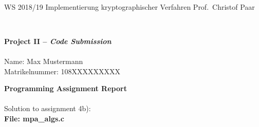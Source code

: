 \documentclass[11pt, a4paper, onecolumn, oneside]{scrartcl}
\begin{document}
{~}

\vspace{-2cm} \noindent WS 2018/19 \hfill
Implementierung kryptographischer Verfahren
\hfill Prof.\ Christof Paar

{~}

\begin{center}
        {\huge \textbf{Project II -- \emph{Code Submission}}}\\
        {~}\\
        {\large Name: Max Mustermann} \\  %
				{\large Matrikelnummer: 108XXXXXXXXX} %
\end{center}

{\large \textbf{Programming Assignment Report\\}}
\\\vspace{5cm}
Solution to assignment 4b):\\


\newpage
{\large \textbf{File: mpa\_algs.c}}
\begin{lstlisting}[style=CStyle]
 %TODO: PASTE THE WHOLE CODE FROM mpa_algs.c HERE


\end{lstlisting}
\end{document}

